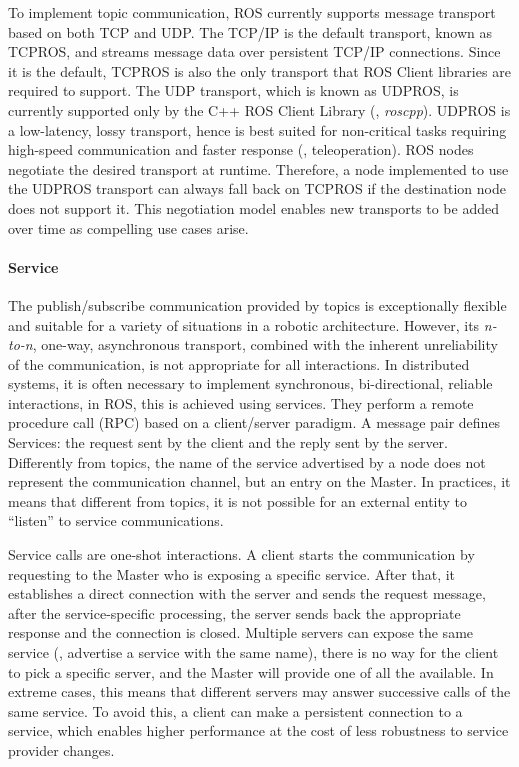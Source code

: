To implement topic communication, ROS currently supports message transport based on both TCP and UDP. The TCP/IP is the default transport, known as TCPROS, and streams message data over persistent TCP/IP connections. Since it is the default, TCPROS is also the only transport that ROS Client libraries are required to support. The UDP transport, which is known as UDPROS, is currently supported only by the C++ ROS Client Library (\ie, \textit{roscpp}). UDPROS is a low-latency, lossy transport, hence is best suited for non-critical tasks requiring high-speed communication and faster response (\eg, teleoperation). ROS nodes negotiate the desired transport at runtime. Therefore, a node implemented to use the UDPROS transport can always fall back on TCPROS if the destination node does not support it. This negotiation model enables new transports to be added over time as compelling use cases arise. 

\paragraph{Service} The publish/subscribe communication provided by topics is exceptionally flexible and suitable for a variety of situations in a robotic architecture. However, its \textit{n-to-n}, one-way, asynchronous transport, combined with the inherent unreliability of the communication, is not appropriate for all interactions. In distributed systems, it is often necessary to implement synchronous, bi-directional, reliable interactions, in ROS, this is achieved using services. They perform a remote procedure call (RPC) based on a client/server paradigm. A message pair defines Services: the request sent by the client and the reply sent by the server. Differently from topics, the name of the service advertised by a node does not represent the communication channel, but an entry on the Master. In practices, it means that different from topics, it is not possible for an external entity to ``listen'' to service communications.

Service calls are one-shot interactions. A client starts the communication by requesting to the Master who is exposing a specific service. After that, it establishes a direct connection with the server and sends the request message, after the service-specific processing, the server sends back the appropriate response and the connection is closed. Multiple servers can expose the same service (\ie, advertise a service with the same name), there is no way for the client to pick a specific server, and the Master will provide one of all the available. In extreme cases, this means that different servers may answer successive calls of the same service. To avoid this, a client can make a persistent connection to a service, which enables higher performance at the cost of less robustness to service provider changes.

